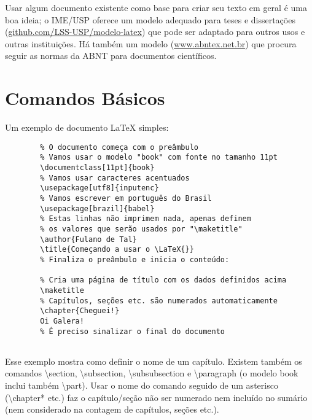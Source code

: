 Usar algum documento existente como base para criar seu texto em geral é
uma boa ideia; o IME/USP oferece um modelo adequado para teses e
dissertações (\url{github.com/LSS-USP/modelo-latex}) que pode ser
adaptado para outros usos e outras instituições. Há também um modelo
(\url{www.abntex.net.br}) que procura seguir as normas da ABNT para
documentos científicos.

\section{Comandos Básicos}

Um exemplo de documento \LaTeX{} simples:

\begin{verbatim}
        % O documento começa com o preâmbulo
        % Vamos usar o modelo "book" com fonte no tamanho 11pt
        \documentclass[11pt]{book}
        % Vamos usar caracteres acentuados
        \usepackage[utf8]{inputenc}
        % Vamos escrever em português do Brasil
        \usepackage[brazil]{babel}
        % Estas linhas não imprimem nada, apenas definem
        % os valores que serão usados por "\maketitle"
        \author{Fulano de Tal}
        \title{Começando a usar o \LaTeX{}}
        % Finaliza o preâmbulo e inicia o conteúdo:
        
        % Cria uma página de título com os dados definidos acima
        \maketitle
        % Capítulos, seções etc. são numerados automaticamente
        \chapter{Cheguei!}
        Oi Galera!
        % É preciso sinalizar o final do documento
        
\end{verbatim}

Esse exemplo mostra como definir o nome de um capítulo. Existem também os
comandos \textsf{\textbackslash{}section}, \textsf{\textbackslash{}subsection},
\textsf{\textbackslash{}subsubsection} e \textsf{\textbackslash{}paragraph}
(o modelo \textsf{book} inclui também \textsf{\textbackslash{}part}). Usar o
nome do comando seguido de um asterisco (\textsf{\textbackslash{}chapter*}
etc.) faz o capítulo/seção não ser numerado nem incluído no sumário (nem
considerado na contagem de capítulos, seções etc.).

